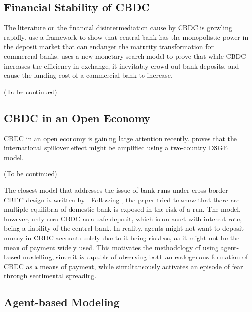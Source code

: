 \subsection{Financial Stability of CBDC}

The literature on the financial disintermediation cause by CBDC is growling rapidly.
\citet*{FVSSU21} use a \citet*{DD83} framework to show that central bank has the
monopolistic power in the deposit market that can endanger the maturity
transformation for commercial banks.
\citet*{Keister19} uses a new monetary search model to prove that while CBDC increases the efficiency in exchange, it inevitably crowd out bank deposits, and cause the funding cost of a commercial bank to increase.

\begin{center}
(To be continued)
\end{center}

\subsection{CBDC in an Open Economy}
CBDC in an open economy is gaining large attention recently. \citet*{FMS22} proves that the international spillover effect might be amplified using a two-country DSGE model.

\begin{center}
(To be continued)
\end{center}

The closest model that addresses the issue of bank runs under cross-border CBDC
design is written by \citet{Popescu22}. Following \citet*{DD83}, the paper tried
to show that there are multiple equilibria of domestic bank is exposed in the
risk of a run. The model, however, only sees CBDC as a safe deposit, which is an
asset with interest rate, being a liability of the central bank. In reality,
agents might not want to deposit money in CBDC accounts solely due to it being
riskless, as it might not be the mean of payment widely used. This motivates the
methodology of using agent-based modelling, since it is capable of observing
both an endogenous formation of CBDC as a means of payment, while simultaneously
activates an episode of fear through sentimental spreading.


\subsection{Agent-based Modeling}
